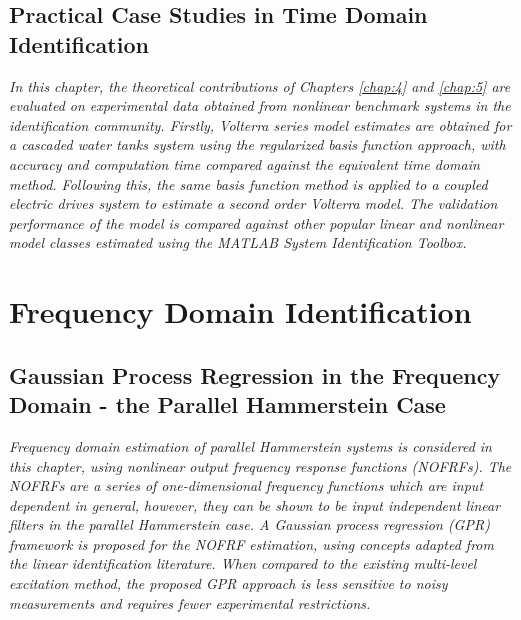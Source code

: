 \documentclass[11pt,twoside]{report}
\begin{document}
\cleardoublepage
\chapter{Practical Case Studies in Time Domain Identification}
\label{chap:6}
\emph{In this chapter, the theoretical contributions of Chapters \ref{chap:4} and \ref{chap:5} are evaluated on experimental data obtained from nonlinear benchmark systems in the identification community. Firstly, Volterra series model estimates are obtained for a cascaded water tanks system using the regularized basis function approach, with accuracy and computation time compared against the equivalent time domain method. Following this, the same basis function method is applied to a coupled electric drives system to estimate a second order Volterra model. The validation performance of the model is compared against other popular linear and nonlinear model classes estimated using the MATLAB System Identification Toolbox.}
\newpage


\cleardoublepage
\part{Frequency Domain Identification}
\label{part:FD}

\cleardoublepage
\chapter{Gaussian Process Regression in the Frequency Domain - the Parallel Hammerstein Case}
\label{chap:7}
\emph{Frequency domain estimation of parallel Hammerstein systems is considered in this chapter, using nonlinear output frequency response functions (NOFRFs). The NOFRFs are a series of one-dimensional frequency functions which are input dependent in general, however, they can be shown to be input independent linear filters in the parallel Hammerstein case. A Gaussian process regression (GPR) framework is proposed for the NOFRF estimation, using concepts adapted from the linear identification literature. When compared to the existing multi-level excitation method, the proposed GPR approach is less sensitive to noisy measurements and requires fewer experimental restrictions.}
\newpage

\end{document}
